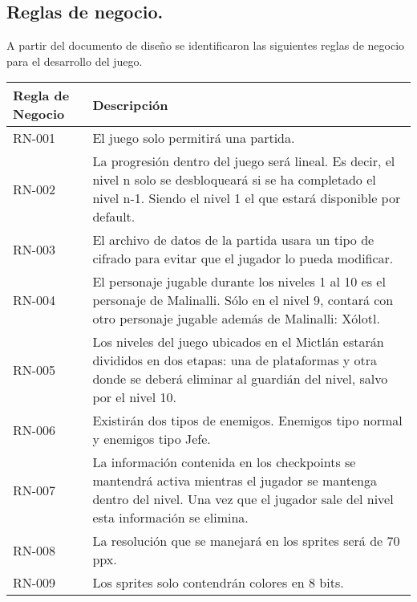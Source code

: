 \subsection{Reglas de negocio.}
A partir del documento de diseño se identificaron las siguientes reglas de negocio para el desarrollo del juego. 

\begin{longtable}[c]{ | m{5cm} | m{10cm}|} 
		\hline
		\rowcolor{cyan}Regla de Negocio & Descripción \\ 
		\hline
		RN-001\label{RN:01} & El juego solo permitirá una partida. \\ 
		\hline
		RN-002\label{RN:02} & La progresión dentro del juego será lineal. Es decir, el nivel n solo se desbloqueará si se ha completado el nivel n-1. Siendo el nivel 1 el que estará disponible por default.\\ 
		\hline
		RN-003\label{RN:03} & El archivo de datos de la partida usara un tipo de cifrado para evitar que el jugador lo pueda modificar.\\ 
		\hline
		RN-004\label{RN:04} & El personaje jugable durante los niveles 1 al 10 es el personaje de Malinalli. Sólo en el nivel 9, contará con otro personaje jugable además de Malinalli: Xólotl. \\ 
		\hline
		RN-005\label{RN:05} & Los niveles del juego ubicados en el Mictlán estarán divididos en dos etapas: una de plataformas y otra donde se deberá eliminar al guardián del nivel, salvo por el nivel 10. \\ 
		\hline
		RN-006\label{RN:06} & Existirán dos tipos de enemigos. Enemigos tipo normal y enemigos tipo Jefe. \\ 
		\hline
		RN-007\label{RN:07} & La información contenida en los checkpoints se mantendrá activa mientras el jugador se mantenga dentro del nivel. Una vez que el jugador sale del nivel esta información se elimina.\\ 
		\hline
		RN-008\label{RN:08} & La resolución que se manejará en los sprites será de 70 ppx.\\ 
		\hline
		RN-009\label{RN:09} & Los sprites solo contendrán colores en 8 bits.\\ 
		\hline

\end{longtable}
